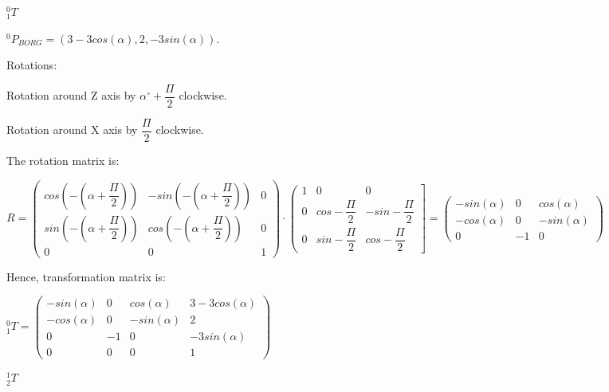 \documentclass[12pt]{article}
\begin{document}
\begin{list}{)~}{}
\item
$_{1}^{0}T$

$^0 P_{BORG} = \left(3-3cos\left(\alpha\right), 2, -3sin\left(\alpha\right)\right)$.

Rotations:

\begin{list}{)~}{}
\item Rotation around Z axis by $\alpha^\circ + \dfrac{\Pi}{2}$ clockwise.
\item Rotation around X axis by $\dfrac{\Pi}{2}$ clockwise.
\end{list}

The rotation matrix is:

$R=\left(\begin{array}{ccc}
cos\left(-\left(\alpha+\dfrac{\Pi}{2}\right)\right) & -sin\left(-\left(\alpha+\dfrac{\Pi}{2}\right)\right) & 0 \\
sin\left(-\left(\alpha+\dfrac{\Pi}{2}\right)\right) & cos\left(-\left(\alpha+\dfrac{\Pi}{2}\right)\right) & 0\\
0 & 0 & 1\end{array}\right)\cdot 
\left(\begin{array}{ccc}
1 & 0 & 0\\
0 & cos -\dfrac{\Pi}{2} & -sin -\dfrac{\Pi}{2} \\
0 & sin -\dfrac{\Pi}{2} & cos -\dfrac{\Pi}{2} \end{array}\right] = 
\left(\begin{array}{ccc}
-sin\left(\alpha\right) & 0 & cos\left(\alpha\right)\\
- cos\left(\alpha\right) & 0 & -sin\left(\alpha\right)\\
0 & -1 & 0\end{array}\right)$

Hence, transformation matrix is:

$_{1}^{0}T = \left(\begin{array}{cccc}
-sin\left(\alpha\right) & 0 & cos\left(\alpha\right) & 3-3cos\left(\alpha\right)\\
- cos\left(\alpha\right) & 0 & - sin\left(\alpha\right) & 2\\
0 & -1 & 0 & -3sin\left(\alpha\right)\\
0 & 0 & 0 & 1 \end{array}\right)$

\newpage

\item
$_{2}^{1}T$


\end{list}
\end{document}
